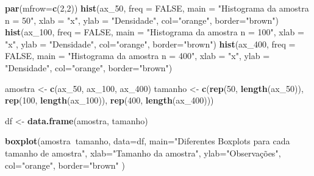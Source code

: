 \documentclass[11pt,]{article}
\newenvironment{Shaded}{\begin{snugshade}}{\end{snugshade}}
\newcommand{\DataTypeTok}[1]{\textcolor[rgb]{0.13,0.29,0.53}{#1}}
\newcommand{\DecValTok}[1]{\textcolor[rgb]{0.00,0.00,0.81}{#1}}
\newcommand{\KeywordTok}[1]{\textcolor[rgb]{0.13,0.29,0.53}{\textbf{#1}}}
\newcommand{\NormalTok}[1]{#1}
\newcommand{\OperatorTok}[1]{\textcolor[rgb]{0.81,0.36,0.00}{\textbf{#1}}}
\newcommand{\OtherTok}[1]{\textcolor[rgb]{0.56,0.35,0.01}{#1}}
\newcommand{\StringTok}[1]{\textcolor[rgb]{0.31,0.60,0.02}{#1}}
\begin{document}
\begin{Shaded}
\begin{Highlighting}[]
\KeywordTok{par}\NormalTok{(}\DataTypeTok{mfrow=}\KeywordTok{c}\NormalTok{(}\DecValTok{2}\NormalTok{,}\DecValTok{2}\NormalTok{))}
\KeywordTok{hist}\NormalTok{(ax_}\DecValTok{50}\NormalTok{, }\DataTypeTok{freq =} \OtherTok{FALSE}\NormalTok{, }\DataTypeTok{main =} \StringTok{"Histograma da amostra n = 50"}\NormalTok{,}
     \DataTypeTok{xlab =} \StringTok{"x"}\NormalTok{, }\DataTypeTok{ylab =} \StringTok{"Densidade"}\NormalTok{,}
     \DataTypeTok{col=}\StringTok{"orange"}\NormalTok{, }\DataTypeTok{border=}\StringTok{"brown"}\NormalTok{)}
\KeywordTok{hist}\NormalTok{(ax_}\DecValTok{100}\NormalTok{, }\DataTypeTok{freq =} \OtherTok{FALSE}\NormalTok{, }\DataTypeTok{main =} \StringTok{"Histograma da amostra n = 100"}\NormalTok{,}
     \DataTypeTok{xlab =} \StringTok{"x"}\NormalTok{, }\DataTypeTok{ylab =} \StringTok{"Densidade"}\NormalTok{,}
     \DataTypeTok{col=}\StringTok{"orange"}\NormalTok{, }\DataTypeTok{border=}\StringTok{"brown"}\NormalTok{)}
\KeywordTok{hist}\NormalTok{(ax_}\DecValTok{400}\NormalTok{, }\DataTypeTok{freq =} \OtherTok{FALSE}\NormalTok{, }\DataTypeTok{main =} \StringTok{"Histograma da amostra n = 400"}\NormalTok{,}
     \DataTypeTok{xlab =} \StringTok{"x"}\NormalTok{, }\DataTypeTok{ylab =} \StringTok{"Densidade"}\NormalTok{,}
     \DataTypeTok{col=}\StringTok{"orange"}\NormalTok{, }\DataTypeTok{border=}\StringTok{"brown"}\NormalTok{)}

\NormalTok{amostra <-}\StringTok{ }\KeywordTok{c}\NormalTok{(ax_}\DecValTok{50}\NormalTok{, ax_}\DecValTok{100}\NormalTok{, ax_}\DecValTok{400}\NormalTok{)}
\NormalTok{tamanho <-}\StringTok{ }\KeywordTok{c}\NormalTok{(}\KeywordTok{rep}\NormalTok{(}\DecValTok{50}\NormalTok{, }\KeywordTok{length}\NormalTok{(ax_}\DecValTok{50}\NormalTok{)),}
             \KeywordTok{rep}\NormalTok{(}\DecValTok{100}\NormalTok{, }\KeywordTok{length}\NormalTok{(ax_}\DecValTok{100}\NormalTok{)),}
             \KeywordTok{rep}\NormalTok{(}\DecValTok{400}\NormalTok{, }\KeywordTok{length}\NormalTok{(ax_}\DecValTok{400}\NormalTok{)))}

\NormalTok{df <-}\StringTok{ }\KeywordTok{data.frame}\NormalTok{(amostra, tamanho)}

\KeywordTok{boxplot}\NormalTok{(amostra}\OperatorTok{~}\NormalTok{tamanho,}
\DataTypeTok{data=}\NormalTok{df,}
\DataTypeTok{main=}\StringTok{"Diferentes Boxplots para cada tamanho de amostra"}\NormalTok{,}
\DataTypeTok{xlab=}\StringTok{"Tamanho da amostra"}\NormalTok{,}
\DataTypeTok{ylab=}\StringTok{"Observações"}\NormalTok{,}
\DataTypeTok{col=}\StringTok{"orange"}\NormalTok{,}
\DataTypeTok{border=}\StringTok{"brown"}
\NormalTok{)}
\end{Highlighting}
\end{Shaded}
\end{document}
